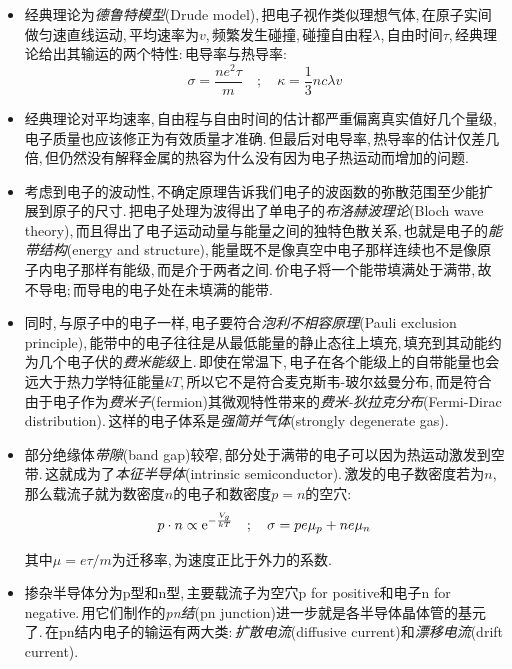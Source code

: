 


\begin{itemize}
	\item 经典理论为\emph{德鲁特模型}(Drude model),\,把电子视作类似理想气体,\,在原子实间做匀速直线运动,\,平均速率为$v$,\,频繁发生碰撞,\,碰撞自由程$\lambda$,\,自由时间$\tau$,\,经典理论给出其输运的两个特性:\,电导率与热导率:
	\[\sigma=\frac{ne^2\tau}{m}\quad ;\quad \kappa=\frac{1}{3}nc\lambda v\]

	\item 经典理论对平均速率,\,自由程与自由时间的估计都严重偏离真实值好几个量级,\,电子质量也应该修正为有效质量才准确.\,但最后对电导率,\,热导率的估计仅差几倍,\,但仍然没有解释金属的热容为什么没有因为电子热运动而增加的问题.
	\item 考虑到电子的波动性,\,不确定原理告诉我们电子的波函数的弥散范围至少能扩展到原子的尺寸.\,把电子处理为波得出了单电子的\emph{布洛赫波理论}(Bloch wave theory),\,而且得出了电子运动动量与能量之间的独特色散关系,\,也就是电子的\emph{能带结构}(energy and structure),\,能量既不是像真空中电子那样连续也不是像原子内电子那样有能级,\,而是介于两者之间.\,价电子将一个能带填满处于满带,\,故不导电;\,而导电的电子处在未填满的能带.

	\item 同时,\,与原子中的电子一样,\,电子要符合\emph{泡利不相容原理}(Pauli exclusion principle),\,能带中的电子往往是从最低能量的静止态往上填充,\,填充到其动能约为几个电子伏的\emph{费米能级}上.\,即使在常温下,\,电子在各个能级上的自带能量也会远大于热力学特征能量$kT$,\,所以它不是符合麦克斯韦-玻尔兹曼分布,\,而是符合由于电子作为\emph{费米子}(fermion)其微观特性带来的\emph{费米-狄拉克分布}(Fermi-Dirac distribution).\,这样的电子体系是\emph{强简并气体}(strongly degenerate gas).
	\item 部分绝缘体\emph{带隙}(band gap)较窄,\,部分处于满带的电子可以因为热运动激发到空带.\,这就成为了\emph{本征半导体}(intrinsic semiconductor).\,激发的电子数密度若为$n$,\,那么载流子就为数密度$n$的电子和数密度$p=n$的空穴:
	\[p\cdot n\propto {\rm e}^{-\frac{V_g}{kT}}\quad ;\quad \sigma=pe\mu_p+ne\mu_n\]

	其中$\mu=e\tau/m$为迁移率,\,为速度正比于外力的系数.

	\item 掺杂半导体分为p型和n型,\,主要载流子为空穴p for positive和电子n for negative.\,用它们制作的\emph{pn结}(pn junction)进一步就是各半导体晶体管的基元了.\,在pn结内电子的输运有两大类:\,\emph{扩散电流}(diffusive current)和\emph{漂移电流}(drift current).
\end{itemize}

